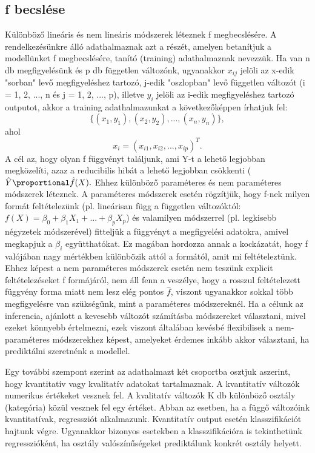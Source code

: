 \documentclass[12pt]{article}
\theoremstyle{plain}
\begin{document}
\subsection{f becslése}
Különböző lineáris és nem lineáris módszerek léteznek f megbecslésére. A rendelkezésünkre álló adathalmaznak azt a részét, amelyen betanítjuk a modellünket f megbecslésére, tanító (training) adathalmaznak nevezzük. Ha van n db megfigyelésünk és p db független változónk, ugyanakkor $x_{ij}$ jelöli az x-edik "sorban" levő megfigyeléshez tartozó, j-edik "oszlopban" levő független változót (i = 1, 2, ..., n és j = 1, 2, ..., p), illetve $y_i$ jelöli az i-edik megfigyeléshez tartozó outputot, akkor a training adathalmazunkat a következőképpen írhatjuk fel: $$ \{(x_1, y_1), (x_2, y_2), ..., (x_n, y_n)\}, $$ ahol $$ x_i = (x_{i1}, x_{i2}, ..., x_{ip})^T.$$ A cél az, hogy olyan f függvényt találjunk, ami Y-t a lehető legjobban megközelíti, azaz a reducibilis hibát a lehető legjobban csökkenti ($\hat{Y} \proportional \hat{f}(X).$ Ehhez különböző paraméteres és nem paraméteres módszerek léteznek. A paraméteres módszerek esetén rögzítjük, hogy f-nek milyen formát feltételezünk (pl. lineárisan függ a független változóktól: $ f(X) = \beta_0 + \beta_1 X_1 + ... + \beta_p X_p $) és valamilyen módszerrel (pl. legkisebb négyzetek módszerével) fitteljük a függvényt a megfigyelési adatokra, amivel megkapjuk a $\beta_i$ együtthatókat. Ez magában hordozza annak a kockázatát, hogy f valójában nagy mértékben különbözik attól a formától, amit mi feltételeztünk. Ehhez képest a nem paraméteres módszerek esetén nem teszünk explicit feltételezéseket f formájáról, nem áll fenn a veszélye, hogy a rosszul feltételezett függvény forma miatt nem lesz elég pontos $\hat{f}$, viszont ugyanakkor sokkal több megfigyelésre van szükségünk, mint a paraméteres módszereknél. Ha a célunk az inferencia, ajánlott a kevesebb változót számításba módszereket választani, mivel ezeket könnyebb értelmezni, ezek viszont általában kevésbé flexibilisek a nem-paraméteres módszerekhez képest, amelyeket érdemes inkább akkor választani, ha prediktálni szeretnénk a modellel. 

Egy további szempont szerint az adathalmazt két csoportba osztjuk aszerint, hogy kvantitatív vagy kvalitatív adatokat tartalmaznak. A kvantitatív változók numerikus értékeket vesznek fel. A kvalitatív változók K db különböző osztály (kategória) közül vesznek fel egy értéket. Abban az esetben, ha a függő változóink kvantitatívak, regressziót alkalmazunk. Kvantitatív output esetén klasszifikációt hajtunk végre. Ugyanakkor bizonyos esetekben a klasszifikációra is tekinthetünk regresszióként, ha osztály valószínűségeket prediktálunk konkrét osztály helyett. 
\end{document}
